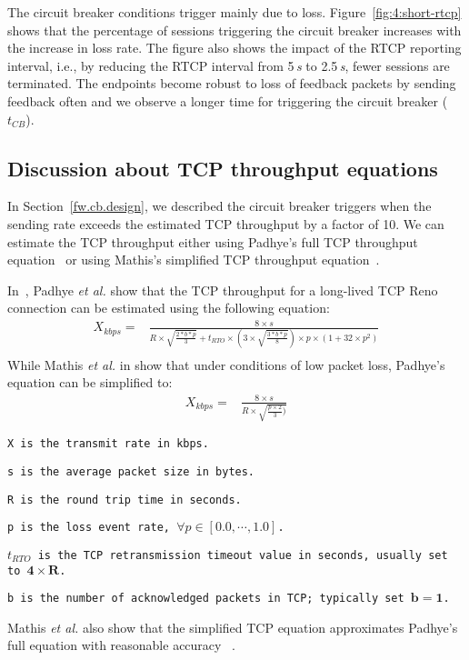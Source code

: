 The circuit breaker conditions trigger mainly due to loss. Figure~\ref{fig:4:short-rtcp} 
shows that the percentage of sessions triggering the circuit breaker
increases with the increase in loss rate. The figure also shows the impact of
the RTCP reporting interval, i.e., by reducing the RTCP interval from 5\,\emph{s} to
2.5\,\emph{s}, fewer sessions are terminated. The endpoints become robust to loss of
feedback packets by sending feedback often and we observe a longer time for
triggering the circuit breaker ($t_{CB}$).

\subsection{Discussion about TCP throughput equations}

In Section~\ref{fw.cb.design}, we described the circuit breaker triggers when
the sending rate exceeds the estimated TCP throughput by a factor of 10. We
can estimate the TCP throughput either using Padhye's full TCP throughput
equation~\cite{padhye1998modeling} or using Mathis's simplified TCP throughput
equation~\cite{mathis1997macroscopic}.

In~\cite{padhye1998modeling}, Padhye \emph{et al.} show that the TCP
throughput for a long-lived TCP Reno connection can be estimated using the
following equation:
\begin{align*}
X_{kbps} = &\frac{8 \times s}{R \times \sqrt{\frac{2*b*p}{3}}+t_{RTO} \times (3 \times \sqrt{\frac{3*b*p}{8}})\times p \times (1+32 \times p^2)}\\
\end{align*}
While Mathis \emph{et al.} in \cite{mathis1997macroscopic} show that under
conditions of low packet loss, Padhye's equation can be simplified to:
\begin{align*}
    X_{kbps} = & \frac{8 \times s}{R \times \sqrt{\frac{p \times 2}{3})}}
\end{align*}
\begin{itemize}
\setlength{\itemsep}{0pt}
{\footnotesize
\item[] \texttt{X is the transmit rate in kbps.}
\item[] \texttt{s is the average packet size in bytes.} 
\item[] \texttt{R is the round trip time in seconds. }
\item[] \texttt{p is the loss event rate, $\forall p \in [0.0, \cdots ,1.0]$.}
\item[] \texttt{$t_{RTO}$ is the TCP retransmission timeout value in seconds, usually set to $\mathbf{4 \times R}$.}
\item[] \texttt{b is the number of acknowledged packets in TCP; typically set $\mathbf{b=1}$.}
}
\end{itemize}
Mathis \emph{et al.} also show that the simplified TCP equation approximates
Padhye's full equation with reasonable accuracy~\cite{mathis1997macroscopic} .


